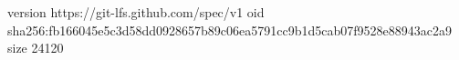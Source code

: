 version https://git-lfs.github.com/spec/v1
oid sha256:fb166045e5c3d58dd0928657b89c06ea5791cc9b1d5cab07f9528e88943ac2a9
size 24120
